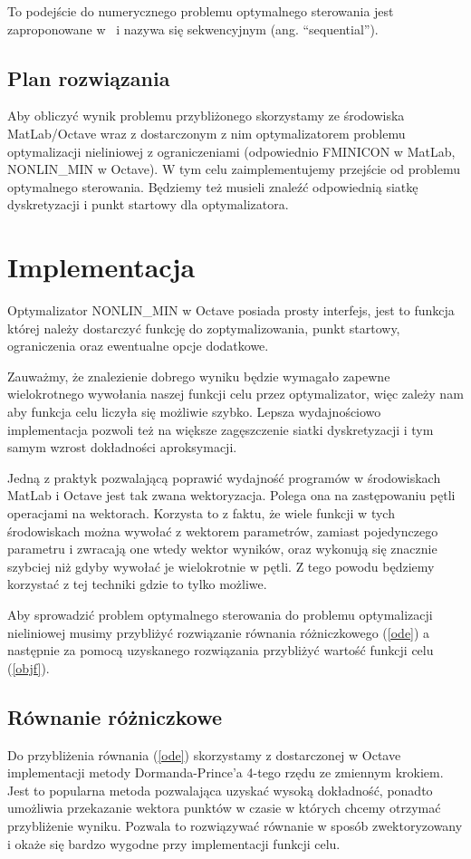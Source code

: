 \documentclass[11pt]{article}
\begin{document}
To podejście do numerycznego problemu optymalnego sterowania jest zaproponowane w~\cite{diehl} i nazywa się sekwencyjnym (ang. ``sequential''). 

\subsection{Plan rozwiązania}
Aby obliczyć wynik problemu przybliżonego skorzystamy ze środowiska MatLab/Octave wraz z dostarczonym z nim optymalizatorem problemu optymalizacji nieliniowej z ograniczeniami (odpowiednio FMINICON w MatLab, NONLIN\_MIN w Octave). W tym celu zaimplementujemy przejście od problemu optymalnego sterowania. Będziemy też musieli znaleźć odpowiednią siatkę dyskretyzacji i punkt startowy dla optymalizatora.

\section{Implementacja}
Optymalizator NONLIN\_MIN w Octave posiada prosty interfejs, jest to funkcja której należy dostarczyć funkcję do zoptymalizowania, punkt startowy, ograniczenia oraz ewentualne opcje dodatkowe.

Zauważmy, że znalezienie dobrego wyniku będzie wymagało zapewne wielokrotnego wywołania naszej funkcji celu przez optymalizator, więc zależy nam aby funkcja celu liczyła się możliwie szybko. Lepsza wydajnościowo implementacja pozwoli też na większe zagęszczenie siatki dyskretyzacji i tym samym wzrost dokładności aproksymacji.

Jedną z praktyk pozwalającą poprawić wydajność programów w środowiskach MatLab i Octave jest tak zwana wektoryzacja. Polega ona na zastępowaniu pętli operacjami na wektorach. Korzysta to z faktu, że wiele funkcji w tych środowiskach można wywołać z wektorem parametrów, zamiast pojedynczego parametru i zwracają one wtedy wektor wyników, oraz wykonują się znacznie szybciej niż gdyby wywołać je wielokrotnie w pętli. Z tego powodu będziemy korzystać z tej techniki gdzie to tylko możliwe.

Aby sprowadzić problem optymalnego sterowania do problemu optymalizacji nieliniowej musimy przybliżyć rozwiązanie równania różniczkowego (\ref{ode}) a następnie za pomocą uzyskanego rozwiązania przybliżyć wartość funkcji celu (\ref{objf}).

\subsection{Równanie różniczkowe}
Do przybliżenia równania (\ref{ode}) skorzystamy z dostarczonej w Octave implementacji metody Dormanda-Prince'a 4-tego rzędu ze zmiennym krokiem. Jest to popularna metoda pozwalająca uzyskać wysoką dokładność, ponadto umożliwia przekazanie wektora punktów w czasie w których chcemy otrzymać przybliżenie wyniku. Pozwala to rozwiązywać równanie w sposób zwektoryzowany i okaże się bardzo wygodne przy implementacji funkcji celu.
\end{document}
